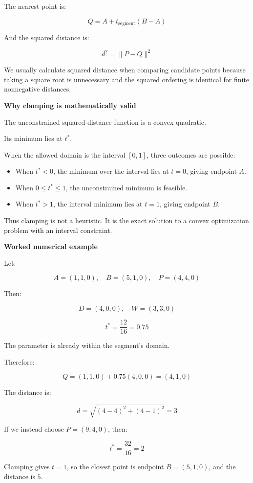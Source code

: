The nearest point is:

\[
\boxed{ Q=A+t_{\mathrm{segment}}(B-A) }
\]

And the squared distance is:

\[
\boxed{ d^2=\|P-Q\|^2 }
\]

We usually calculate squared distance when comparing candidate points because taking a square root is unnecessary and the squared ordering is identical for finite nonnegative distances.

\textbf{Why clamping is mathematically valid}

The unconstrained squared-distance function is a convex quadratic.

Its minimum lies at \(t^*\).

When the allowed domain is the interval \([0,1]\), three outcomes are possible:

\begin{itemize}
\tightlist
\item
  When \(t^*<0\), the minimum over the interval lies at \(t=0\), giving endpoint \(A\).
\item
  When \(0\le t^*\le1\), the unconstrained minimum is feasible.
\item
  When \(t^*>1\), the interval minimum lies at \(t=1\), giving endpoint \(B\).
\end{itemize}

Thus clamping is not a heuristic. It is the exact solution to a convex optimization problem with an interval constraint.

\textbf{Worked numerical example}

Let:

\[
A=(1,1,0),\quad B=(5,1,0),\quad P=(4,4,0)
\]

Then:

\[
D=(4,0,0),\quad W=(3,3,0)
\]

\[
t^*=\frac{12}{16}=0.75
\]

The parameter is already within the segment's domain.

Therefore:

\[
Q=(1,1,0)+0.75(4,0,0)=(4,1,0)
\]

The distance is:

\[
d=\sqrt{(4-4)^2+(4-1)^2}=3
\]

If we instead choose \(P=(9,4,0)\), then:

\[
t^*=\frac{32}{16}=2
\]

Clamping gives \(t=1\), so the closest point is endpoint \(B=(5,1,0)\), and the distance is \(5\).

